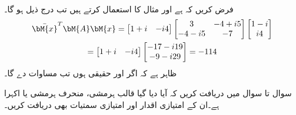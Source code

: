 \quad {}\\
فرض کریں کہ  ہے اور مثال  کا  استعمال کرتے ہیں تب درج ذیل ہو گا۔
\begin{multline*}
\bar{\bM{x}}^T\bM{A}\bM{x}=\begin{bmatrix} 1+i&-i4 \end{bmatrix}
\begin{bmatrix} 3&-4+i5\\-4-i5&-7 \end{bmatrix}
\begin{bmatrix} 
1-i\\i4 \end{bmatrix}\\
=\begin{bmatrix} 1+i&-i4 \end{bmatrix}\begin{bmatrix} -17-i19\\-9-i29 \end{bmatrix}
=-114
\end{multline*}
ظاہر ہے کہ اگر   اور  حقیقی ہوں تب مساوات   دے گا۔


سوال  تا سوال  میں دریافت کریں کہ آیا دیا گیا قالب ہرمشی، منحرف ہرمشی یا اکہرا ہے۔ان کے امتیازی اقدار اور امتیازی سمتیات بھی دریافت کریں۔ 

